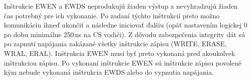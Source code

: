 Inštrukcie EWEN a EWDS neprodukujú žiaden výstup a nevyhradzujú žiaden čas potrebný pre ich vykonanie. Po zadaní týchto inštrukcií preto možno komunikáciu ihneď ukončiť a následne iniciovať ďalšiu (opäť nastavením logickej 0 po dobu minimálne 250\,ns na CS vodiči). Z dôvodu zabezpečenia integrity dát sú po zapnutí napájania zakázané všetky inštrukcie zápisu (WRITE, ERASE, WRAL, ERAL). Inštrukcia EWEN musí byť preto vykonaná pred akoukoľvek inštrukciou zápisu. Po vykonaní inštrukcie EWEN sú inštrukcie zápisu povolené kým nebude vykonaná inštrukcia EWDS alebo do vypnutia napájania.